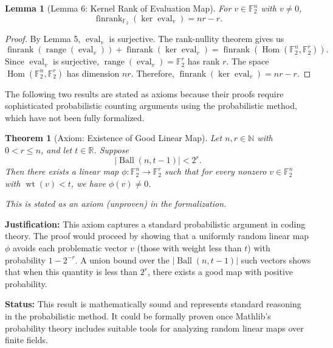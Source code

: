 \documentclass[11pt]{article}
\theoremstyle{plain}
\newtheorem*{theorem}{Theorem}
\newtheorem*{lemma}{Lemma}
\theoremstyle{definition}
\theoremstyle{remark}
\renewcommand{\ker}{\operatorname{ker}}
\begin{document}
\begin{lemma}[Lemma 6: Kernel Rank of Evaluation Map]
For $v \in \mathbb{F}_2^n$ with $v \neq 0$,
\[
\operatorname{finrank}_{\mathbb{F}_2}(\ker \operatorname{eval}_v) = nr - r.
\]
\end{lemma}

\begin{proof}
By Lemma 5, $\operatorname{eval}_v$ is surjective. The rank-nullity theorem gives us
\[
\operatorname{finrank}(\operatorname{range}(\operatorname{eval}_v)) + \operatorname{finrank}(\ker \operatorname{eval}_v) = \operatorname{finrank}(\operatorname{Hom}(\mathbb{F}_2^n, \mathbb{F}_2^r)).
\]
Since $\operatorname{eval}_v$ is surjective, $\operatorname{range}(\operatorname{eval}_v) = \mathbb{F}_2^r$ has rank $r$. The space $\operatorname{Hom}(\mathbb{F}_2^n, \mathbb{F}_2^r)$ has dimension $nr$. Therefore, $\operatorname{finrank}(\ker \operatorname{eval}_v) = nr - r$.
\end{proof}

The following two results are stated as axioms because their proofs require sophisticated probabilistic counting arguments using the probabilistic method, which have not been fully formalized.

\begin{theorem}[Axiom: Existence of Good Linear Map]
Let $n, r \in \mathbb{N}$ with $0 < r \leq n$, and let $t \in \mathbb{R}$. Suppose
\[
\bigl|\operatorname{Ball}(n, t-1)\bigr| < 2^r.
\]
Then there exists a linear map $\phi : \mathbb{F}_2^n \to \mathbb{F}_2^r$ such that for every nonzero $v \in \mathbb{F}_2^n$ with $\operatorname{wt}(v) < t$, we have $\phi(v) \neq 0$.

\textit{This is stated as an axiom (unproven) in the formalization.}
\end{theorem}

\textbf{Justification:} This axiom captures a standard probabilistic argument in coding theory. The proof would proceed by showing that a uniformly random linear map $\phi$ avoids each problematic vector $v$ (those with weight less than $t$) with probability $1 - 2^{-r}$. A union bound over the $|\operatorname{Ball}(n,t-1)|$ such vectors shows that when this quantity is less than $2^r$, there exists a good map with positive probability.

\textbf{Status:} This result is mathematically sound and represents standard reasoning in the probabilistic method. It could be formally proven once Mathlib's probability theory includes suitable tools for analyzing random linear maps over finite fields.
\end{document}
